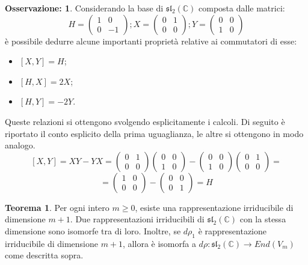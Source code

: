 \documentclass[12pt,a4paper]{report}
\theoremstyle{definition}
\theoremstyle{Theorem}
\newtheorem{Theo}[Def]{Teorema}
\theoremstyle{definition}
\theoremstyle{definition}
\theoremstyle{definition}
\newtheorem{Obs}[Def]{Osservazione:}
\begin{document}
\begin{Obs}\label{Obs1}
	Considerando la base di $\mathfrak{sl_2(\mathbb{C})}$ composta dalle matrici: $$H=
	\begin{pmatrix}
		1&0\\
		0&-1
	\end{pmatrix}; 
	X=\begin{pmatrix}
		0&1\\
		0&0
	\end{pmatrix};
	Y=\begin{pmatrix}
		0&0\\
		1&0
	\end{pmatrix}$$
è possibile dedurre alcune importanti proprietà relative ai commutatori di esse:
\begin{itemize}
	\item $[X,Y]=H$;
	\item $[H,X]=2X$;
	\item $[H,Y]=-2Y$.
\end{itemize}
Queste relazioni si ottengono svolgendo esplicitamente i calcoli. Di seguito è riportato il conto esplicito della prima uguaglianza, le altre si ottengono in modo analogo.
$$[X,Y]=XY-YX=\begin{pmatrix}
	0&1\\
	0&0
\end{pmatrix}
\begin{pmatrix}
	0&0\\
	1&0
\end{pmatrix}-
\begin{pmatrix}
	0&0\\
	1&0
\end{pmatrix}
\begin{pmatrix}
	0&1\\
	0&0
\end{pmatrix}=$$$$=
\begin{pmatrix}
1&0\\
0&0
\end{pmatrix}-\begin{pmatrix}
0&0\\
0&1
\end{pmatrix}=H$$
\end{Obs}
\begin{Theo}\label{Theo2}
	Per ogni intero $m\geq 0$, esiste una rappresentazione irriducibile di dimensione $m+1$. Due rappresentazioni irriducibili di $\mathfrak{sl_2(\mathbb{C})}$ con la stessa dimensione sono isomorfe tra di loro. Inoltre, se $d\rho_1$ è rappresentazione irriducibile di dimensione $m+1$, allora è isomorfa a $d\rho:\mathfrak{sl_2(\mathbb{C})}\rightarrow End(V_m)$ come descritta sopra.
\end{Theo}
\end{document}
